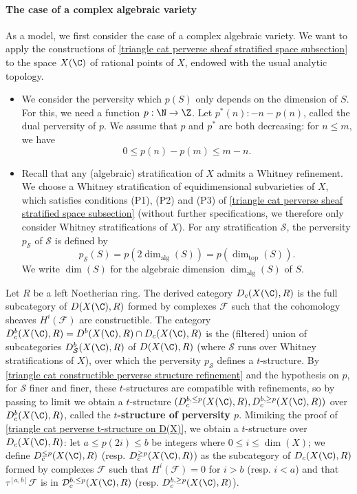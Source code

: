 \paragraph{The case of a complex algebraic variety}\label{triangle cat perverse sheaf complex variety paragraph}
As a model, we first consider the case of a complex algebraic variety. We want to apply the constructions of \autoref{triangle cat perverse sheaf stratified space subsection} to the space $X(\C)$ of rational points of $X$, endowed with the usual analytic topology.
\begin{itemize}
    \item We consider the perversity which $p(S)$ only depends on the dimension of $S$. For this, we need a function $p:\N\to\Z$. Let $p^*(n):-n-p(n)$, called the dual perversity of $p$. We assume that $p$ and $p^*$ are both decreasing: for $n\leq m$, we have
    \[0\leq p(n)-p(m)\leq m-n.\]
    \item Recall that any (algebraic) stratification of $X$ admits a Whitney refinement. We choose a Whitney stratification of equidimensional subvarieties of $X$, which satisfies conditions (P1), (P2) and (P3) of \autoref{triangle cat perverse sheaf stratified space subsection} (without further specifications, we therefore only consider Whitney stratifications of $X$). For any stratification $\mathcal{S}$, the perversity $p_\mathcal{S}$ of $\mathcal{S}$ is defined by
    \[p_\mathcal{S}(S)=p(2\dim_{\mathrm{alg}}(S))=p(\dim_{\mathrm{top}}(S)).\]
    We write $\dim(S)$ for the algebraic dimension $\dim_{\mathrm{alg}}(S)$ of $S$.
\end{itemize}

Let $R$ be a left Noetherian ring. The derived category $D_c(X(\C),R)$ is the full subcategory of $D(X(\C),R)$ formed by complexes $\mathcal{F}$ such that the cohomology sheaves $H^i(\mathscr{F})$ are constructible. The category $D^b_c(X(\C),R)=D^b(X(\C),R)\cap D_c(X(\C),R)$ is the (filtered) union of subcategories $D^b_\mathcal{S}(X(\C),R)$ of $D(X(\C),R)$ (where $\mathcal{S}$ runs over Whitney stratifications of $X$), over which the perversity $p_\mathcal{S}$ defines a $t$-structure. By \cref{triangle cat constructible perverse structure refinement} and the hypothesis on $p$, for $\mathcal{S}$ finer and finer, these $t$-structures are compatible with refinements, so by passing to limit we obtain a $t$-structure $(D^{b,\leq p}_c(X(\C),R),D^{b,\geq p}_c(X(\C),R))$ over $D^b_c(X(\C),R)$, called the \textbf{$t$-structure of perversity $p$}. Mimiking the proof of \cref{triangle cat perverse t-structure on D(X)}, we obtain a $t$-structure over $D_c(X(\C),R)$: let $a\leq p(2i)\leq b$ be integers where $0\leq i\leq\dim(X)$; we define $D_c^{\leq p}(X(\C),R)$ (resp. $D_c^{\geq p}(X(\C),R)$) as the subcategory of $D_c(X(\C),R)$ formed by complexes $\mathscr{F}$ such that $H^i(\mathscr{F})=0$ for $i>b$ (resp. $i<a$) and that $\tau^{[a,b]}\mathscr{F}$ is in $\mathcal{D}_c^{b,\leq p}(X(\C),R)$ (resp. $D_c^{b,\geq p}(X(\C),R)$).

